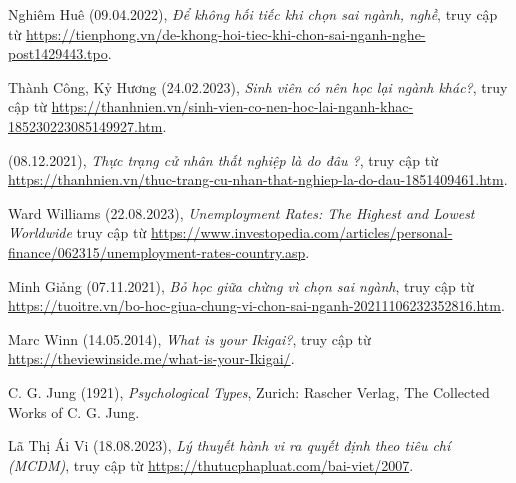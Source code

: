 {}
\renewcommand\bibname{Tài liệu tham khảo}

\begin{thebibliography}{99}
    Nghiêm Huê (09.04.2022),
    \emph{Để không hối tiếc khi chọn sai ngành, nghề},
    truy cập từ \href{https://tienphong.vn/de-khong-hoi-tiec-khi-chon-sai-nganh-nghe-post1429443.tpo}{\color{black}https://tienphong.vn/de-khong-hoi-tiec-khi-chon-sai-nganh-nghe-post1429443.tpo}.

    Thành Công, Kỷ Hương (24.02.2023),
    \emph{Sinh viên có nên học lại ngành khác?},
    truy cập từ \href{https://thanhnien.vn/sinh-vien-co-nen-hoc-lai-nganh-khac-185230223085149927.htm}{\color{black}https://thanhnien.vn/sinh-vien-co-nen-hoc-lai-nganh-khac-185230223085149927.htm}.

    (08.12.2021),
    \emph{Thực trạng cử nhân thất nghiệp là do đâu ?},
    truy cập từ \href{https://thanhnien.vn/thuc-trang-cu-nhan-that-nghiep-la-do-dau-1851409461.htm}{\color{black}https://thanhnien.vn/thuc-trang-cu-nhan-that-nghiep-la-do-dau-1851409461.htm}.

    Ward Williams (22.08.2023),
    \emph{Unemployment Rates: The Highest and Lowest Worldwide}
    truy cập từ \href{https://www.investopedia.com/articles/personal-finance/062315/unemployment-rates-country.asp}{\color{black}https://www.investopedia.com/articles/personal-finance/062315/unemployment-rates-country.asp}.

    Minh Giảng (07.11.2021),
    \emph{Bỏ học giữa chừng vì chọn sai ngành},
    truy cập từ \href{https://tuoitre.vn/bo-hoc-giua-chung-vi-chon-sai-nganh-20211106232352816.htm}{\color{black}https://tuoitre.vn/bo-hoc-giua-chung-vi-chon-sai-nganh-20211106232352816.htm}.

    Marc Winn (14.05.2014),
    \emph{What is your Ikigai?},
    truy cập từ \href{https://theviewinside.me/what-is-your-Ikigai/}{\color{black}https://theviewinside.me/what-is-your-Ikigai/}.

    C. G. Jung (1921),
    \emph{Psychological Types},
    Zurich: Rascher Verlag,
    The Collected Works of C. G. Jung.

    Lã Thị Ái Vi (18.08.2023),
    \emph{Lý thuyết hành vi ra quyết định theo tiêu chí (MCDM)},
    truy cập từ \href{https://thutucphapluat.com/bai-viet/2007}
    {\color{black}https://thutucphapluat.com/bai-viet/2007}.


\end{thebibliography}
